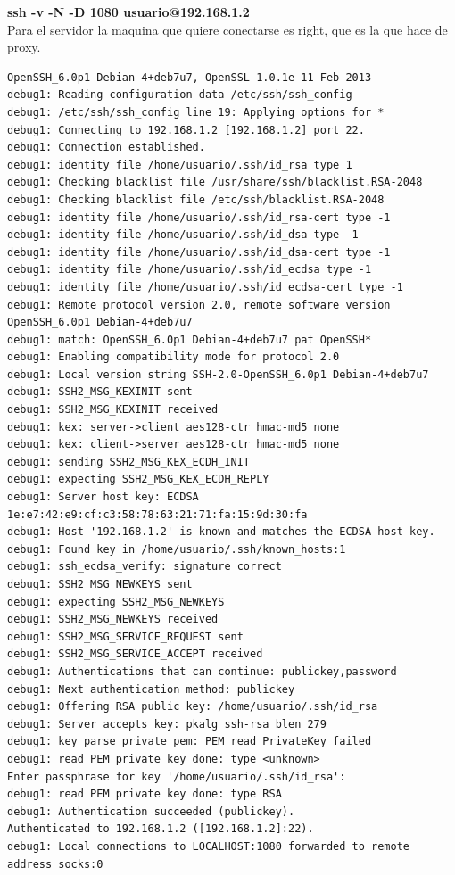 \documentclass[11pt]{article}
\begin{document}
      \bigskip
      \par
      \textbf{ssh -v -N -D 1080 usuario@192.168.1.2}\\
      Para el servidor la maquina que quiere conectarse es right, que es la que
      hace de proxy.

\begin{lstlisting}
OpenSSH_6.0p1 Debian-4+deb7u7, OpenSSL 1.0.1e 11 Feb 2013
debug1: Reading configuration data /etc/ssh/ssh_config
debug1: /etc/ssh/ssh_config line 19: Applying options for *
debug1: Connecting to 192.168.1.2 [192.168.1.2] port 22.
debug1: Connection established.
debug1: identity file /home/usuario/.ssh/id_rsa type 1
debug1: Checking blacklist file /usr/share/ssh/blacklist.RSA-2048
debug1: Checking blacklist file /etc/ssh/blacklist.RSA-2048
debug1: identity file /home/usuario/.ssh/id_rsa-cert type -1
debug1: identity file /home/usuario/.ssh/id_dsa type -1
debug1: identity file /home/usuario/.ssh/id_dsa-cert type -1
debug1: identity file /home/usuario/.ssh/id_ecdsa type -1
debug1: identity file /home/usuario/.ssh/id_ecdsa-cert type -1
debug1: Remote protocol version 2.0, remote software version OpenSSH_6.0p1 Debian-4+deb7u7
debug1: match: OpenSSH_6.0p1 Debian-4+deb7u7 pat OpenSSH*
debug1: Enabling compatibility mode for protocol 2.0
debug1: Local version string SSH-2.0-OpenSSH_6.0p1 Debian-4+deb7u7
debug1: SSH2_MSG_KEXINIT sent
debug1: SSH2_MSG_KEXINIT received
debug1: kex: server->client aes128-ctr hmac-md5 none
debug1: kex: client->server aes128-ctr hmac-md5 none
debug1: sending SSH2_MSG_KEX_ECDH_INIT
debug1: expecting SSH2_MSG_KEX_ECDH_REPLY
debug1: Server host key: ECDSA 1e:e7:42:e9:cf:c3:58:78:63:21:71:fa:15:9d:30:fa
debug1: Host '192.168.1.2' is known and matches the ECDSA host key.
debug1: Found key in /home/usuario/.ssh/known_hosts:1
debug1: ssh_ecdsa_verify: signature correct
debug1: SSH2_MSG_NEWKEYS sent
debug1: expecting SSH2_MSG_NEWKEYS
debug1: SSH2_MSG_NEWKEYS received
debug1: SSH2_MSG_SERVICE_REQUEST sent
debug1: SSH2_MSG_SERVICE_ACCEPT received
debug1: Authentications that can continue: publickey,password
debug1: Next authentication method: publickey
debug1: Offering RSA public key: /home/usuario/.ssh/id_rsa
debug1: Server accepts key: pkalg ssh-rsa blen 279
debug1: key_parse_private_pem: PEM_read_PrivateKey failed
debug1: read PEM private key done: type <unknown>
Enter passphrase for key '/home/usuario/.ssh/id_rsa': 
debug1: read PEM private key done: type RSA
debug1: Authentication succeeded (publickey).
Authenticated to 192.168.1.2 ([192.168.1.2]:22).
debug1: Local connections to LOCALHOST:1080 forwarded to remote address socks:0

\end{lstlisting}
\end{document}
